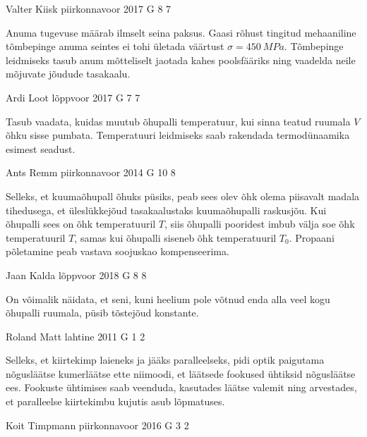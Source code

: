 \documentclass[11pt]{article}
\begin{document}
{%
{Valter Kiisk} %
{piirkonnavoor} %
{2017} %
{G 8} %
{7} %
{

\ifHint
Anuma tugevuse määrab ilmselt seina paksus. Gaasi rõhust tingitud mehaaniline tõmbepinge anuma seintes ei tohi ületada väärtust $\sigma=\SI{450}{MPa}$. Tõmbepinge leidmiseks tasub anum mõtteliselt jaotada kahes poolsfääriks ning vaadelda neile mõjuvate jõudude tasakaalu.
\fi
}

{Ardi Loot} %
{lõppvoor} %
{2017} %
{G 7} %
{7} %
{

\ifHint
Tasub vaadata, kuidas muutub õhupalli temperatuur, kui sinna teatud ruumala $V$ õhku sisse pumbata. Temperatuuri leidmiseks saab rakendada termodünaamika esimest seadust.
\fi
}

{Ants Remm} %
{piirkonnavoor} %
{2014} %
{G 10} %
{8} %
{

\ifHint
Selleks, et kuumaõhupall õhuks püsiks, peab sees olev õhk olema piisavalt madala tihedusega, et üleslükkejõud tasakaalustaks kuumaõhupalli raskusjõu. Kui õhupalli sees on õhk temperatuuril $T$, siis õhupalli pooridest imbub välja soe õhk temperatuuril $T$, samas kui õhupalli siseneb õhk temperatuuril $T_0$. Propaani põletamine peab vastava soojuskao kompenseerima.
\fi
}

{Jaan Kalda} %
{lõppvoor} %
{2018} %
{G 8} %
{8} %
{

\ifHint
On võimalik näidata, et seni, kuni heelium pole võtnud enda alla veel kogu õhupalli ruumala, püsib tõstejõud konstante.
\fi
}

{Roland Matt} %
{lahtine} %
{2011} %
{G 1} %
{2} %
{

\ifHint
Selleks, et kiirtekimp laieneks ja jääks paralleelseks, pidi optik paigutama
nõgusläätse kumerläätse ette niimoodi, et läätsede fookused ühtiksid nõgusläätse
ees. Fookuste ühtimises saab veenduda, kasutades läätse valemit ning arvestades, et paralleelse kiirtekimbu kujutis asub lõpmatuses.
\fi
}

{Koit Timpmann} %
{piirkonnavoor} %
{2016} %
{G 3} %
{2} %
{

}}
\end{document}
